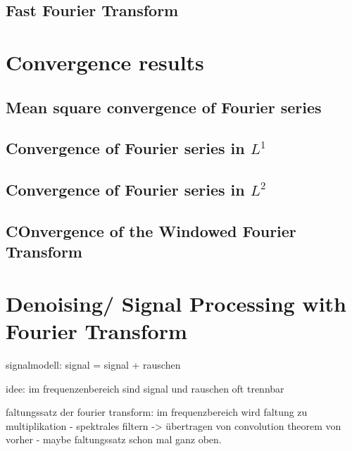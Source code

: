 \documentclass[a4paper,11pt,bibliography=totoc,listof=totoc,headinclude=true,cleardoublepage=empty,oneside]{scrbook}
\theoremstyle{definition}
\theoremstyle{remark}
\begin{document}
 \subsection{Fast Fourier Transform} %

\section{Convergence results}
 \subsection{Mean square convergence of Fourier series} 
  \cite[Chapter 3, Theorem 1.1]{steinFourierAnalysisIntroduction2003a}
  
 \subsection{Convergence of Fourier series in $L^1$}
  \cite[Chapter 2, Theorem 5.2]{steinFourierAnalysisIntroduction2003a} %

 \subsection{Convergence of Fourier series in $L^2$}
  \cite[Chapter 3, Theorem 2.1]{steinFourierAnalysisIntroduction2003a} %

 \subsection{COnvergence of the Windowed Fourier Transform} 


\section{Denoising/ Signal Processing with Fourier Transform} %

signalmodell: signal = signal + rauschen


idee: im frequenzenbereich sind signal und rauschen oft trennbar


faltungssatz der fourier transform: im frequenzbereich wird faltung zu multiplikation - spektrales filtern
-> übertragen von convolution theorem von vorher - maybe faltungssatz schon mal ganz oben.
\end{document}
